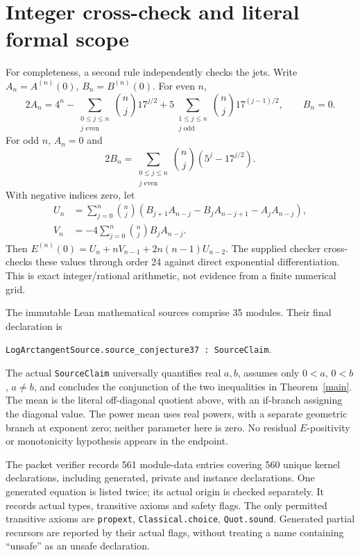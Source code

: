 \documentclass[11pt]{article}
\begin{document}
\section{Integer cross-check and literal formal scope}
For completeness, a second rule independently checks the jets. Write $A_n=A^{(n)}(0)$, $B_n=B^{(n)}(0)$. For even $n$,
\[
2A_n=4^n-\sum_{\substack{0\le j\le n\\j\text{ even}}}\binom nj17^{j/2}
 +5\sum_{\substack{1\le j\le n\\j\text{ odd}}}\binom nj17^{(j-1)/2},\qquad B_n=0.
\]
For odd $n$, $A_n=0$ and
\[
 2B_n=\sum_{\substack{0\le j\le n\\j\text{ even}}}\binom nj(5^j-17^{j/2}).
\]
With negative indices zero, let
\begin{align*}
 U_n&=\sum_{j=0}^n\binom nj
 (B_{j+1}A_{n-j}-B_jA_{n-j+1}-A_jA_{n-j}),\\
 V_n&=-4\sum_{j=0}^n\binom njB_jA_{n-j}.
\end{align*}
Then $E^{(n)}(0)=U_n+nV_{n-1}+2n(n-1)U_{n-2}$. The supplied checker cross-checks these values through order 24 against direct exponential differentiation. This is exact integer/rational arithmetic, not evidence from a finite numerical grid.

The immutable Lean mathematical sources comprise 35 modules. Their final declaration is
\begin{center}
\texttt{LogArctangentSource.source\_conjecture37 : SourceClaim}.
\end{center}
The actual \texttt{SourceClaim} universally quantifies real $a,b$, assumes only $0<a$, $0<b$, $a\ne b$, and concludes the conjunction of the two inequalities in Theorem~\ref{main}. The mean is the literal off-diagonal quotient above, with an if-branch assigning the diagonal value. The power mean uses real powers, with a separate geometric branch at exponent zero; neither parameter here is zero. No residual $E$-positivity or monotonicity hypothesis appears in the endpoint.

The packet verifier records 561 module-data entries covering 560 unique kernel declarations, including generated, private and instance declarations. One generated equation is listed twice; its actual origin is checked separately. It records actual types, transitive axioms and safety flags. The only permitted transitive axioms are \texttt{propext}, \texttt{Classical.choice}, \texttt{Quot.sound}. Generated partial recursors are reported by their actual flags, without treating a name containing ``unsafe'' as an unsafe declaration.
\end{document}
